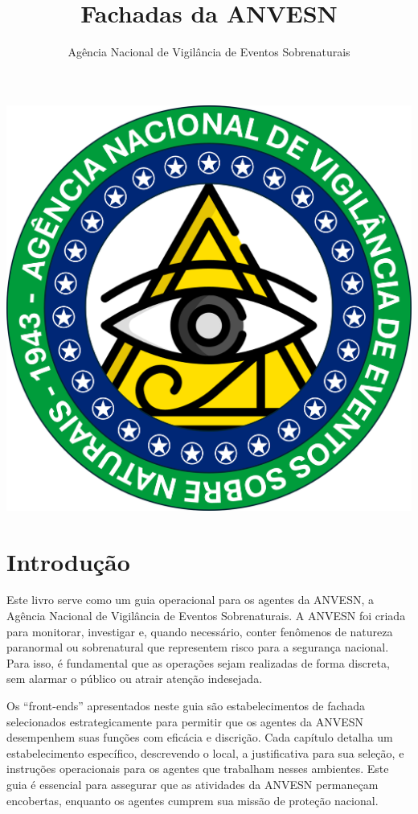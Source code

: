 \documentclass{book}
\title{Fachadas da ANVESN}
\author{Agência Nacional de Vigilância de Eventos Sobrenaturais}
\date{}
\begin{document}
\maketitle

\begin{center}
\newpage
\vspace*{\fill}
\includegraphics[scale=.9]{imagens/ANVESN_LOGO.png}
\vspace*{\fill}
\newpage
\end{center}

\frontmatter
\chapter*{Introdução}
Este livro serve como um guia operacional para os agentes da ANVESN, a Agência Nacional de Vigilância de Eventos Sobrenaturais. A ANVESN foi criada para monitorar, investigar e, quando necessário, conter fenômenos de natureza paranormal ou sobrenatural que representem risco para a segurança nacional. Para isso, é fundamental que as operações sejam realizadas de forma discreta, sem alarmar o público ou atrair atenção indesejada.

Os ``front-ends'' apresentados neste guia são estabelecimentos de fachada selecionados estrategicamente para permitir que os agentes da ANVESN desempenhem suas funções com eficácia e discrição. Cada capítulo detalha um estabelecimento específico, descrevendo o local, a justificativa para sua seleção, e instruções operacionais para os agentes que trabalham nesses ambientes. Este guia é essencial para assegurar que as atividades da ANVESN permaneçam encobertas, enquanto os agentes cumprem sua missão de proteção nacional.
\end{document}

